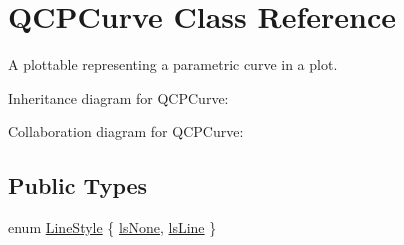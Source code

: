 \hypertarget{classQCPCurve}{}\section{Q\+C\+P\+Curve Class Reference}
\label{classQCPCurve}


A plottable representing a parametric curve in a plot.  




Inheritance diagram for Q\+C\+P\+Curve\+:


Collaboration diagram for Q\+C\+P\+Curve\+:
\subsection*{Public Types}
\begin{DoxyCompactItemize}
\item 
enum \hyperlink{classQCPCurve_a2710e9f79302152cff794c6e16cc01f1}{Line\+Style} \{ \hyperlink{classQCPCurve_a2710e9f79302152cff794c6e16cc01f1aec1601a191cdf0b4e761c4c66092cc48}{ls\+None}, 
\hyperlink{classQCPCurve_a2710e9f79302152cff794c6e16cc01f1ade5822ce6fbf131d3df131795c2e1003}{ls\+Line}
 \}
\end{DoxyCompactItemize}
